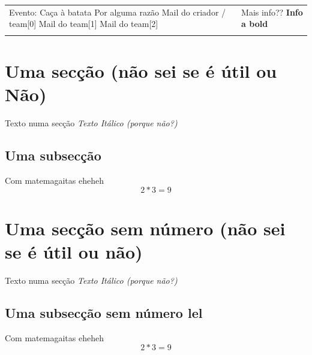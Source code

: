 \documentclass{article}%
\begin{document}
%
\normalsize%
\begin{tabu}{X[l] X[r]}%
\begin{minipage}[h]{0.49\textwidth}%
Evento: Caça à batata%
\newline%
%
Por alguma razão%
\newline%
%
Mail do criador / team{[}0{]}%
\newline%
%
Mail do team{[}1{]}%
\newline%
%
Mail do team{[}2{]}%
\end{minipage}&\begin{minipage}[t!]{0.49\textwidth}%
\flushright%
Mais info??%
\linebreak%
\textbf{Info a bold}%
\linebreak%
\end{minipage}\\%
&\\%
\end{tabu}%
\pagestyle{firstpage}%
\section{Uma secção (não sei se é útil ou Não)}%
\label{sec:Uma seco (no sei se  til ou No)}%
Texto numa secção%
\textit{\newline%
Texto Itálico (porque não?)}%
\subsection{Uma subsecção}%
\label{subsec:Uma subseco}%
Com matemagaitas eheheh%
\[%
2*3 = 9%
\]

%
\section*{Uma secção sem número (não sei se é útil ou não)}%
\label{sec:Uma seco sem nmero (no sei se  til ou no)}%
Texto numa secção%
\textit{\newline%
Texto Itálico (porque não?)}%
\subsection*{Uma subsecção sem número lel}%
\label{subsec:Uma subseco sem nmero lel}%
Com matemagaitas eheheh%
\[%
2*3 = 9%
\]

%
\end{document}

